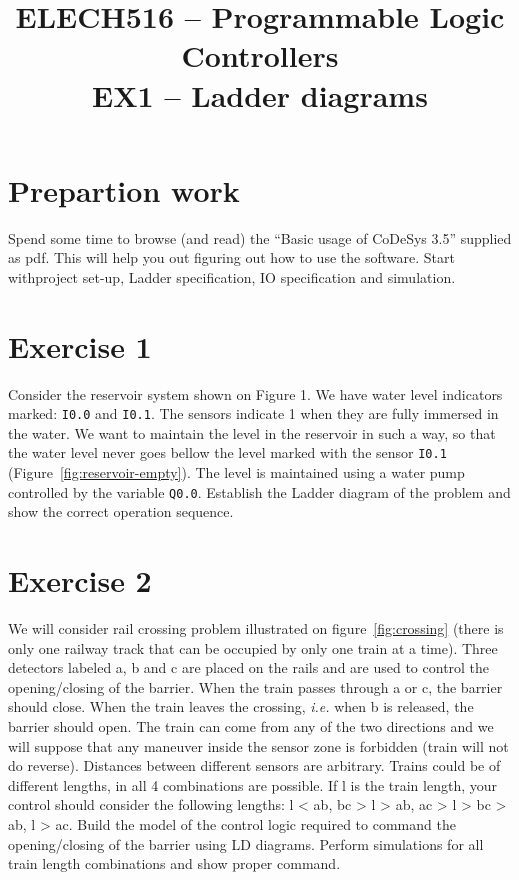 \documentclass{article}
\title{\vspace{-1cm}ELECH516 -- Programmable Logic Controllers\\ \textbf{EX1} -- Ladder diagrams}
\date{\displaydate{date}}
\begin{document}
\maketitle

\section*{Prepartion work}
Spend some time to browse (and read) the ``Basic usage of CoDeSys 3.5'' supplied as pdf.
This will help you out figuring out how to use the software.
Start withproject set-up, Ladder specification, IO specification and simulation.


\section*{Exercise 1}
Consider the reservoir system shown on Figure 1. We have water level indicators marked: \texttt{I0.0} and \texttt{I0.1}.
The sensors indicate 1 when they are fully immersed in the water.
We want to maintain the level in the reservoir in such a way, so that the water level never goes bellow the level marked with the sensor \texttt{I0.1} (Figure~\ref{fig:reservoir-empty}).
The level is maintained using a water pump controlled by the variable \texttt{Q0.0}.
Establish the Ladder diagram of the problem and show the correct operation sequence.


\section*{Exercise 2}

We will consider rail crossing problem illustrated on figure~\ref{fig:crossing} (there is only one railway track that can be occupied by only one train at a time).
Three detectors labeled a, b and c are placed on the rails and are used to control the opening/closing of the barrier.
When the train passes through a or c, the barrier should close.
When the train leaves the crossing, \textit{i.e.} when b is released, the barrier should open.
The train can come from any of the two directions and we will suppose that any maneuver inside the sensor zone is forbidden (train will not do reverse). Distances between different sensors are arbitrary. Trains could be of different lengths, in all 4 combinations are possible. If l is the train length, your control should consider the following lengths: l < ab, bc > l > ab, ac > l > bc > ab, l > ac. Build the model of the control logic required to command the opening/closing of the barrier using LD diagrams. Perform simulations for all train length combinations and show proper command.
\end{document}
